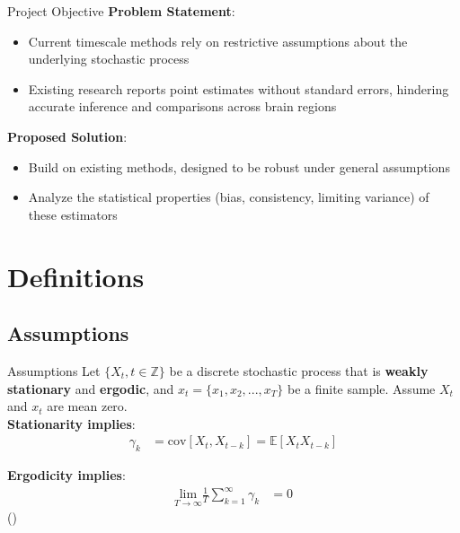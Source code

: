 \documentclass[12pt]{beamer}
\begin{document}
\begin{frame}{Project Objective}
\footnotesize
\textbf{Problem Statement}:
\begin{itemize}
    \item Current timescale methods rely on restrictive assumptions about the underlying stochastic process
    \item Existing research reports point estimates without standard errors, hindering accurate inference and comparisons across brain regions
\end{itemize}
\textbf{Proposed Solution}:
\begin{itemize}
    \item Build on existing methods, designed to be robust under general assumptions
    \item Analyze the statistical properties (bias, consistency, limiting variance) of these estimators
\end{itemize}
\end{frame}

\section{Definitions}

\subsection{Assumptions}
\begin{frame}{Assumptions}
\footnotesize
Let $\{X_t, t\in \mathbb{Z}\}$ be a discrete stochastic process that is \textbf{weakly stationary} and \textbf{ergodic}, and $x_t = \{x_1, x_2, ..., x_T\}$ be a finite sample. Assume $X_t$ and $x_t$ are mean zero.\\
\vspace{0.25cm}
\textbf{Stationarity implies}:
\begin{align}
    \gamma_k &= \text{cov}[X_t, X_{t-k}] = \mathbb{E}[X_t X_{t-k}]
\end{align}

\textbf{Ergodicity implies}:
\begin{align}
    \underset{T\to\infty}{\text{lim}} \frac{1}{T} \sum_{k=1}^\infty \gamma_k &= 0
\end{align}
(\cite{hansen_econometrics_2022})\\
\end{frame}

\end{document}
